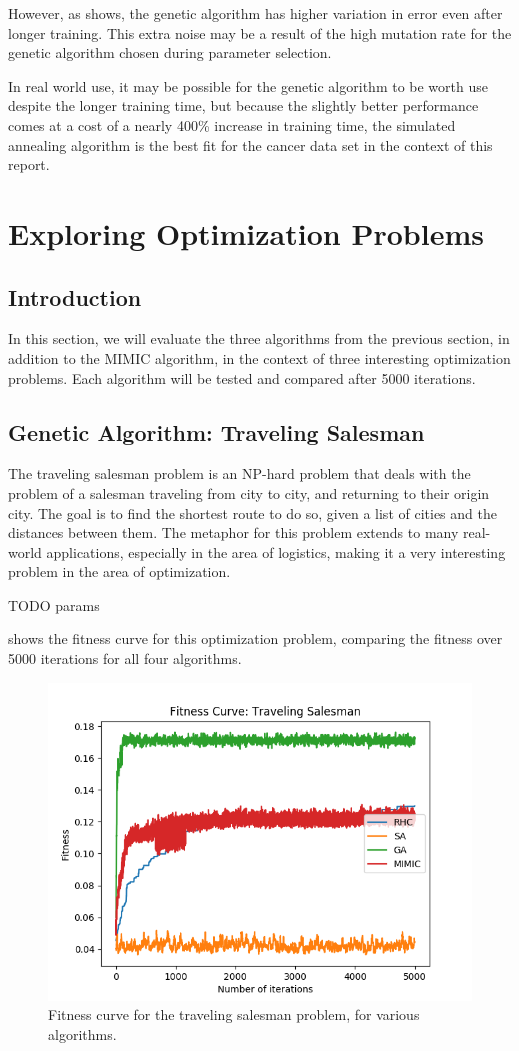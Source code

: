\documentclass{article}
\begin{document}
      However, as  shows, the genetic algorithm has higher variation in error even after longer training. This extra noise may be a result of the high mutation rate for the genetic algorithm chosen during parameter selection.

      In real world use, it may be possible for the genetic algorithm to be worth use despite the longer training time, but because the slightly better performance comes at a cost of a nearly 400\% increase in training time, the simulated annealing algorithm is the best fit for the cancer data set in the context of this report.

  \section{Exploring Optimization Problems}

    \subsection{Introduction}
      In this section, we will evaluate the three algorithms from the previous section, in addition to the MIMIC algorithm, in the context of three interesting optimization problems. Each algorithm will be tested and compared after 5000 iterations.

    \subsection{Genetic Algorithm: Traveling Salesman}
      The traveling salesman problem is an NP-hard problem that deals with the problem of a salesman traveling from city to city, and returning to their origin city. The goal is to find the shortest route to do so, given a list of cities and the distances between them. The metaphor for this problem extends to many real-world applications, especially in the area of logistics, making it a very interesting problem in the area of optimization.

      TODO params

       shows the fitness curve for this optimization problem, comparing the fitness over 5000 iterations for all four algorithms.

      \begin{figure}[htb]
      \centering
      \includegraphics[width=.5\linewidth]{out/op/salesman/fitness.png}
      \caption{Fitness curve for the traveling salesman problem, for various algorithms.}
      \label{fig:fitness-ts}
      \end{figure}
\end{document}
